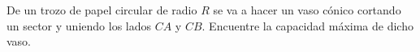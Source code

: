 \item De un trozo de papel circular de radio $R$ se va a hacer un vaso cónico cortando un sector y uniendo los lados $CA$ y $CB$. Encuentre la capacidad máxima de dicho vaso.
\begin{center}
\end{center}
